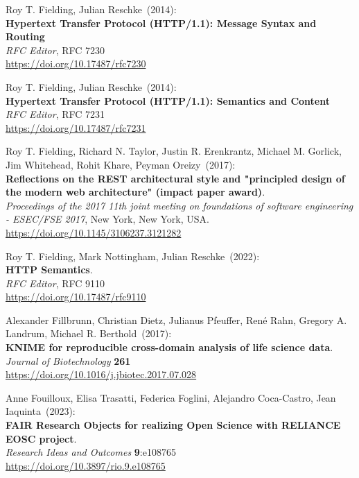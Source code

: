 \begin{thebibliography}{9}
Roy T. Fielding, Julian Reschke~(2014): \\
\textbf{Hypertext {Transfer
Protocol} ({HTTP}/1.1): {Message Syntax} and {Routing}}\\
\emph{RFC Editor}, RFC 7230 \\
\url{https://doi.org/10.17487/rfc7230}

Roy T. Fielding, Julian Reschke~(2014): \\
\textbf{Hypertext {Transfer Protocol} ({HTTP}/1.1): {Semantics} and {Content}} \\
\emph{RFC Editor}, RFC 7231 \\
\url{https://doi.org/10.17487/rfc7231}

Roy T. Fielding, Richard N. Taylor, Justin R. Erenkrantz, Michael M.
Gorlick, Jim Whitehead, Rohit Khare, Peyman Oreizy~(2017): \\
\textbf{Reflections on the {REST} architectural style and "principled
design of the modern web architecture" (impact paper award)}. \\
\emph{Proceedings of the 2017 11th joint meeting on foundations of software engineering - {ESEC}/{FSE} 2017}, New York, New York, USA.\\
\url{https://doi.org/10.1145/3106237.3121282}

Roy T. Fielding, Mark Nottingham, Julian Reschke~(2022): \\
\textbf{HTTP Semantics}.\\
\emph{RFC Editor}, RFC 9110\\
\url{https://doi.org/10.17487/rfc9110}

Alexander Fillbrunn, Christian Dietz, Julianus Pfeuffer, René
Rahn, Gregory A. Landrum, Michael R. Berthold~(2017): \\
\textbf{KNIME for reproducible cross-domain analysis of life science
data}.\\
\emph{Journal of Biotechnology} \textbf{261}\\
\url{https://doi.org/10.1016/j.jbiotec.2017.07.028}

Anne Fouilloux, Elisa Trasatti, Federica Foglini, Alejandro Coca-Castro, Jean Iaquinta~(2023): \\
\textbf{FAIR Research Objects for realizing Open Science with RELIANCE EOSC project}.\\
\emph{Research Ideas and Outcomes} \textbf{9}:e108765 \\
\url{https://doi.org/10.3897/rio.9.e108765}


\end{thebibliography}
